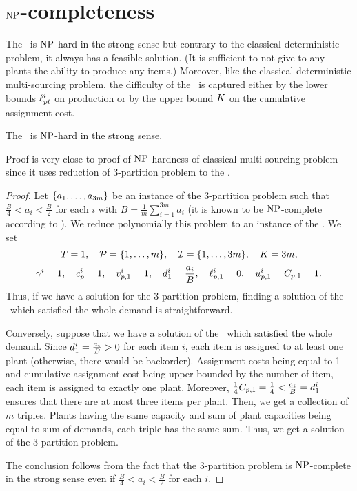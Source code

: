 \section{$\operatorname{NP}$-completeness}
\label{sec:multi-sourcing-limited-capital:NP-completeness}


The \tbc\ is $\operatorname{NP}$-hard in the strong sense but contrary to the classical deterministic problem, it always has a feasible solution.
(It is sufficient to not give to any plants the ability to produce any items.)
Moreover, like the classical deterministic multi-sourcing problem, the difficulty of the \tbc\ is captured either by the lower bounds $\ell_{pt}^i$ on production or by the upper bound $K$ on the cumulative assignment cost.


\begin{thm}\label{thm:det-multi-sourcing:limited-capital:strong-NP-hard}
  The \tbc\ is $\operatorname{NP}$-hard in the strong sense.
\end{thm}


Proof is very close to proof of $\operatorname{NP}$-hardness of classical multi-sourcing problem since it uses reduction of 3-partition problem to the \tbc.


\begin{proof}
Let $\crbracket{a_1,\ldots,a_{3m}}$ be an instance of the 3-partition problem such that $\frac{B}{4} < a_i < \frac{B}{2}$ for each $i$ with $B=\frac{1}{m}\sum_{i=1}^{3m}a_i$ (it is known to be $\operatorname{NP}$-complete according to \cite{Garey1979}).
We reduce polynomially this problem to an instance of the \tbc.
We set
$$
  \horizon=1
  ,\quad
  \plants=\range[1]{m}
  ,\quad
  \REF=\range[1]{3m}
  ,\quad
  \capital = 3m,
$$
$$
  \gamma^i=1
  ,\quad
  c_p^i=1
  ,\quad
  v_{p,1}^i=1
  ,\quad
  d_1^i=\frac{a_i}{B}
  ,\quad
  \ell_{p,1}^i=0
  ,\quad
  u_{p,1}^i=C_{p,1}=1.
$$
Thus, if we have a solution for the 3-partition problem, finding a solution of the \tbc\ which satisfied the whole demand is straightforward.

Conversely, suppose that we have a solution of the \tbc\ which satisfied the whole demand.
Since $d_1^i=\frac{a_i}{B}>0$ for each item $i$, each item is assigned to at least one plant (otherwise, there would be backorder).
Assignment costs being equal to 1 and cumulative assignment cost being upper bounded by the number of item, each item is assigned to exactly one plant.
Moreover, $\frac{1}{4}C_{p,1}=\frac{1}{4} < \frac{a_i}{B}=d_1^i$ ensures that there are at most three items per plant.
Then, we get a collection of $m$ triples.
Plants having the same capacity and sum of plant capacities being equal to sum of demands, each triple has the same sum.
Thus, we get a solution of the 3-partition problem.

The conclusion follows from the fact that the 3-partition problem is $\operatorname{NP}$-complete in the strong sense even if $\frac{B}{4} < a_i < \frac{B}{2}$ for each $i$.
\end{proof}


